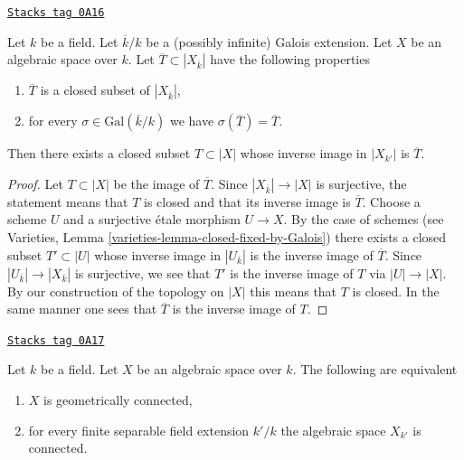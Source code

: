 \begin{lemma}
\label{spaces-over-fields-lemma-closed-fixed-by-Galois}
\href{https://stacks.math.columbia.edu/tag/0A16}{\texttt{Stacks tag 0A16}}

Let $k$ be a field. Let $\overline{k}/k$ be a (possibly infinite)
Galois extension. Let $X$ be an algebraic space over $k$. Let
$\overline{T} \subset |X_{\overline{k}}|$ have the following properties
\begin{enumerate}
\item $\overline{T}$ is a closed subset of $|X_{\overline{k}}|$,
\item for every $\sigma \in \text{Gal}(\overline{k}/k)$
we have $\sigma(\overline{T}) = \overline{T}$.
\end{enumerate}
Then there exists a closed subset $T \subset |X|$ whose inverse image
in $|X_{k'}|$ is $\overline{T}$.
\end{lemma}

\begin{proof}
Let $T \subset |X|$ be the image of $\overline{T}$.
Since $|X_{\overline{k}}| \to |X|$ is surjective, the statement means
that $T$ is closed and that its inverse image is $\overline{T}$.
Choose a scheme $U$ and a surjective \'etale morphism $U \to X$.
By the case of schemes
(see Varieties, Lemma \ref{varieties-lemma-closed-fixed-by-Galois})
there exists a closed subset $T' \subset |U|$ whose inverse image
in $|U_{\overline{k}}|$ is the inverse image of $\overline{T}$.
Since $|U_{\overline{k}}| \to |X_{\overline{k}}|$ is surjective,
we see that $T'$ is the inverse image of $T$ via $|U| \to |X|$.
By our construction of the topology on $|X|$ this means that $T$ is
closed. In the same manner one sees that $\overline{T}$ is the inverse
image of $T$.
\end{proof}

\begin{lemma}
\label{spaces-over-fields-lemma-characterize-geometrically-disconnected}
\href{https://stacks.math.columbia.edu/tag/0A17}{\texttt{Stacks tag 0A17}}

Let $k$ be a field. Let $X$ be an algebraic space over $k$.
The following are equivalent
\begin{enumerate}
\item $X$ is geometrically connected,
\item for every finite separable field extension $k'/k$
the algebraic space $X_{k'}$ is connected.
\end{enumerate}
\end{lemma}

